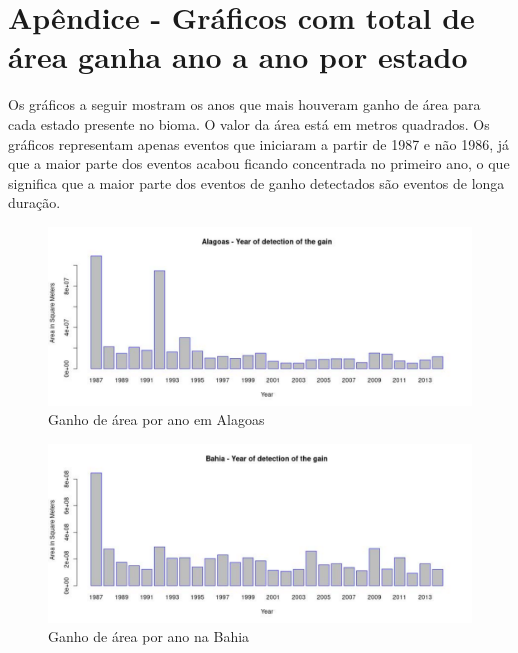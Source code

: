 \section{Apêndice - Gráficos com total de área ganha ano a ano por estado}

\hspace{13pt} Os gráficos a seguir mostram os anos que mais houveram ganho de área para cada estado presente no bioma. O valor da área está em metros quadrados. Os gráficos representam apenas eventos que iniciaram a partir de 1987 e não 1986, já que a maior parte dos eventos acabou ficando concentrada no primeiro ano, o que significa que a maior parte dos eventos de ganho detectados são eventos de longa duração. 

\begin{figure}[H]
    \centering
    \includegraphics[scale=.5]{images/gain_graphics/Alagoas_gain.pdf}
    \caption{Ganho de área por ano em Alagoas}
    \label{fig:gain_alagoas}
\end{figure}

\begin{figure}[H]
    \centering
    \includegraphics[scale=.5]{images/gain_graphics/Bahia_gain.pdf}
    \caption{Ganho de área por ano na Bahia}
    \label{fig:gain_bahia}
\end{figure}

